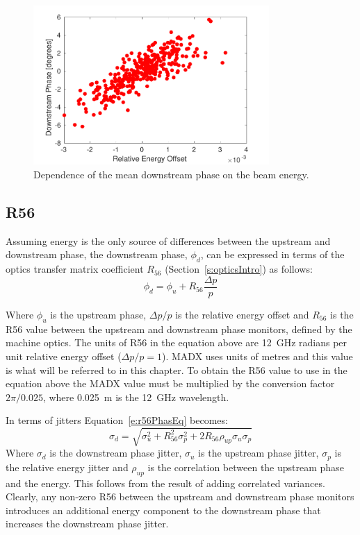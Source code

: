 \begin{figure}
  \centering
  \includegraphics[width=0.8\textwidth]{Figures/propagation/corrDownstreamEn}
  \caption{Dependence of the mean downstream phase on the beam energy.}
  \label{f:corrDownstream_En}
\end{figure}



\subsection{R56}
\label{ss:r56Equations}

Assuming energy is the only source of differences between the upstream and downstream phase, the downstream phase, \(\phi_d\), can be expressed in terms of the optics transfer matrix coefficient \(R_{56}\) (Section~\ref{s:opticsIntro}) as follows:
\begin{equation}
\phi_d = \phi_u + R_{56}\frac{\Delta p}{p}
\label{e:r56PhasEq}
\end{equation}

Where \(\phi_u\) is the upstream phase, \(\Delta p / p\) is the relative energy offset and \(R_{56}\) is the R56 value between the upstream and downstream phase monitors, defined by the machine optics. The units of R56 in the equation above are 12~GHz radians per unit relative energy offset (\(\Delta p/p = 1\)). MADX uses units of metres and this value is what will be referred to in this chapter. To obtain the R56 value to use in the equation above the MADX value must be multiplied by the conversion factor \(2\pi/0.025\), where 0.025~m is the 12~GHz wavelength.

In terms of jitters Equation~\ref{e:r56PhasEq} becomes:
\begin{equation}
\sigma_d = \sqrt{\sigma_u^2 + R_{56}^2\sigma_{p}^2 + 2R_{56}\rho_{up}\sigma_{u}\sigma_{p}}
\label{e:r56JitEq}
\end{equation}
Where \(\sigma_d\) is the downstream phase jitter, \(\sigma_u\) is the upstream phase jitter, \(\sigma_p\) is the relative energy jitter and \(\rho_{up}\) is the correlation between the upstream phase and the energy. This follows from the result of adding correlated variances. Clearly, any non-zero R56 between the upstream and downstream phase monitors introduces an additional energy component to the downstream phase that increases the downstream phase jitter.

